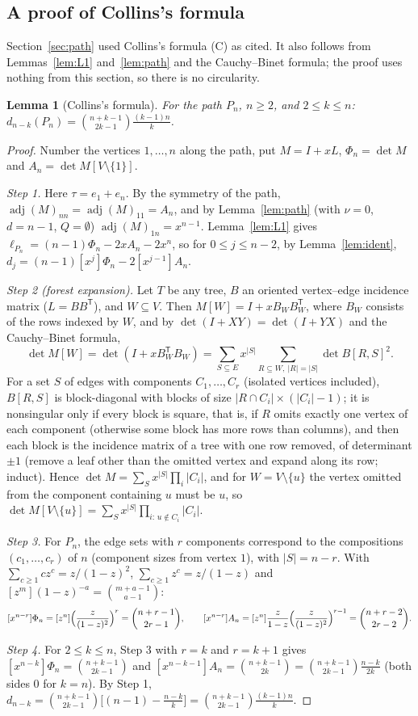 \documentclass[11pt]{amsart}
\newtheorem{lemma}[theorem]{Lemma}
\theoremstyle{definition}
\theoremstyle{remark}
\newcommand{\adj}{\operatorname{adj}}
\newcommand{\T}{\mathsf T}
\begin{document}
\subsection*{A proof of Collins's formula}
Section~\ref{sec:path} used Collins's formula (C) as cited. It also follows
from Lemmas~\ref{lem:L1} and~\ref{lem:path} and the Cauchy--Binet formula;
the proof uses nothing from this section, so there is no circularity.

\begin{lemma}[Collins's formula]\label{lem:collins}
For the path $P_n$, $n\ge2$, and $2\le k\le n$:
$d_{n-k}(P_n)=\binom{n+k-1}{2k-1}\frac{(k-1)n}{k}$.
\end{lemma}

\begin{proof}
Number the vertices $1,\dots,n$ along the path, put $M=I+xL$,
$\Phi_n=\det M$ and $A_n=\det M[V\setminus\{1\}]$.

\emph{Step 1.} Here $\tau=e_1+e_n$. By the symmetry of the path,
$\adj(M)_{nn}=\adj(M)_{11}=A_n$, and by Lemma~\ref{lem:path} (with $\nu=0$,
$d=n-1$, $Q=\emptyset$) $\adj(M)_{1n}=x^{n-1}$. Lemma~\ref{lem:L1} gives
$\ell_{P_n}=(n-1)\Phi_n-2xA_n-2x^n$, so for $0\le j\le n-2$, by
Lemma~\ref{lem:ident}, $d_j=(n-1)[x^j]\Phi_n-2[x^{j-1}]A_n$.

\emph{Step 2 (forest expansion).} Let $T$ be any tree, $B$ an oriented
vertex--edge incidence matrix ($L=BB^\T$), and $W\subseteq V$. Then
$M[W]=I+xB_WB_W^\T$, where $B_W$ consists of the rows indexed by $W$, and by
$\det(I+XY)=\det(I+YX)$ and the Cauchy--Binet formula,
\[
\det M[W]=\det(I+xB_W^\T B_W)=\sum_{S\subseteq E}x^{|S|}\sum_{R\subseteq W,\ |R|=|S|}\det B[R,S]^2 .
\]
For a set $S$ of edges with components $C_1,\dots,C_r$ (isolated vertices
included), $B[R,S]$ is block-diagonal with blocks of size
$|R\cap C_i|\times(|C_i|-1)$; it is nonsingular only if every block is square,
that is, if $R$ omits exactly one vertex of each component (otherwise some
block has more rows than columns), and then each block is the incidence
matrix of a tree with one row removed, of determinant $\pm1$ (remove a leaf
other than the omitted vertex and expand along its row; induct). Hence
$\det M=\sum_Sx^{|S|}\prod_i|C_i|$, and for $W=V\setminus\{u\}$ the vertex
omitted from the component containing $u$ must be $u$, so
$\det M[V\setminus\{u\}]=\sum_Sx^{|S|}\prod_{i:\,u\notin C_i}|C_i|$.

\emph{Step 3.} For $P_n$, the edge sets with $r$ components correspond to
the compositions $(c_1,\dots,c_r)$ of $n$ (component sizes from vertex $1$),
with $|S|=n-r$. With $\sum_{c\ge1}cz^c=z/(1-z)^2$, $\sum_{c\ge1}z^c=z/(1-z)$
and $[z^m](1-z)^{-a}=\binom{m+a-1}{a-1}$:
\[
[x^{n-r}]\Phi_n=[z^n]\Bigl(\frac{z}{(1-z)^2}\Bigr)^r=\binom{n+r-1}{2r-1},\qquad
[x^{n-r}]A_n=[z^n]\frac{z}{1-z}\Bigl(\frac{z}{(1-z)^2}\Bigr)^{r-1}=\binom{n+r-2}{2r-2}.
\]

\emph{Step 4.} For $2\le k\le n$, Step 3 with $r=k$ and $r=k+1$ gives
$[x^{n-k}]\Phi_n=\binom{n+k-1}{2k-1}$ and $[x^{n-k-1}]A_n=\binom{n+k-1}{2k}
=\binom{n+k-1}{2k-1}\frac{n-k}{2k}$ (both sides $0$ for $k=n$). By Step 1,
$d_{n-k}=\binom{n+k-1}{2k-1}\bigl[(n-1)-\frac{n-k}k\bigr]
=\binom{n+k-1}{2k-1}\frac{(k-1)n}{k}$.
\end{proof}
\end{document}

